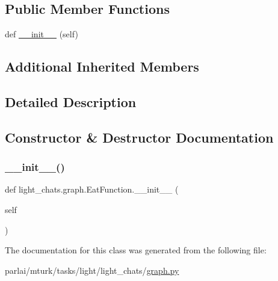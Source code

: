 \subsection*{Public Member Functions}
\begin{DoxyCompactItemize}
\item 
def \hyperlink{classlight__chats_1_1graph_1_1EatFunction_a78b5e03c987945ebced34fe2454613ba}{\+\_\+\+\_\+init\+\_\+\+\_\+} (self)
\end{DoxyCompactItemize}
\subsection*{Additional Inherited Members}


\subsection{Detailed Description}
\begin{DoxyVerb}
\end{DoxyVerb}
 

\subsection{Constructor \& Destructor Documentation}
\mbox{\label{classlight__chats_1_1graph_1_1EatFunction_a78b5e03c987945ebced34fe2454613ba}} 
\subsubsection{\texorpdfstring{\+\_\+\+\_\+init\+\_\+\+\_\+()}{\_\_init\_\_()}}
{\footnotesize\ttfamily def light\+\_\+chats.\+graph.\+Eat\+Function.\+\_\+\+\_\+init\+\_\+\+\_\+ (\begin{DoxyParamCaption}\item[{}]{self }\end{DoxyParamCaption})}



The documentation for this class was generated from the following file\+:\begin{DoxyCompactItemize}
\item 
parlai/mturk/tasks/light/light\+\_\+chats/\hyperlink{parlai_2mturk_2tasks_2light_2light__chats_2graph_8py}{graph.\+py}\end{DoxyCompactItemize}
